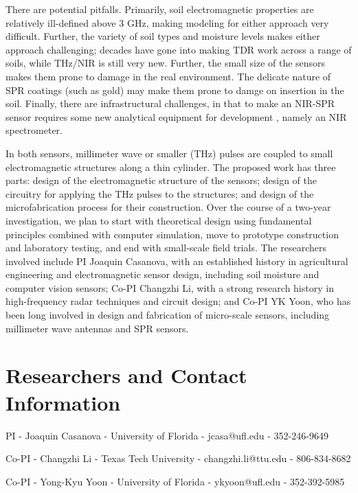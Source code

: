 \documentclass[10pt,letterpaper]{article}
\begin{document}
There are potential pitfalls. Primarily, soil electromagnetic properties are relatively ill-defined above 3 GHz, making modeling for either approach very difficult. Further, the variety of soil types and moisture levels makes either approach challenging; decades have gone into making TDR work across a range of soils, while THz/NIR is still very new. Further, the small size of the sensors makes them prone to damage in the real environment. The delicate nature of SPR coatings (such as gold) may make them prone to damge on insertion in the soil. Finally, there are infrastructural challenges, in that to make an NIR-SPR sensor requires some new analytical equipment for development \cite{ikehata2004surface}, namely an NIR spectrometer.

In both sensors, millimeter wave or smaller (THz) pulses are coupled to small electromagnetic structures along a thin cylinder. The proposed work has three parts: design of the electromagnetic structure of the sensors; design of the circuitry for applying the THz pulses to the structures; and design of the microfabrication process for their construction. Over the course of a two-year investigation, we plan to start with theoretical design using fundamental principles combined with computer simulation, move to prototype construction and laboratory testing, and end with small-scale field trials. The researchers involved include PI Joaquin Casanova, with an established history in agricultural engineering and electromagnetic sensor design, including soil moisture and computer vision sensors; Co-PI Changzhi Li, with a strong research history in high-frequency radar techniques and circuit design; and Co-PI YK Yoon, who has been long involved in design and fabrication of micro-scale sensors, including millimeter wave antennas and SPR sensors. 

\section{Researchers and Contact Information}
\begin{description}
\item{PI} - Joaquin Casanova - University of Florida - jcasa@ufl.edu - 352-246-9649
\item{Co-PI} - Changzhi Li - Texas Tech University - changzhi.li@ttu.edu - 806-834-8682
\item{Co-PI} - Yong-Kyu Yoon -  University of Florida - ykyoon@ufl.edu  - 352-392-5985
\end{description}



  
  
\end{document}
